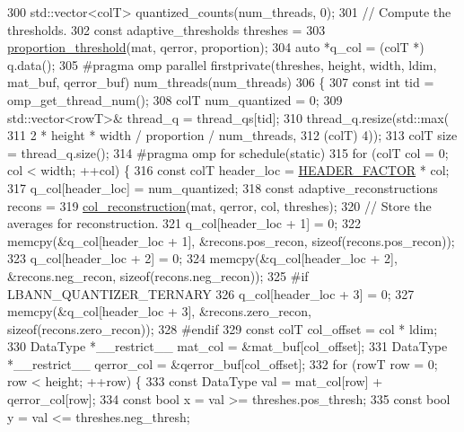\begin{DoxyCode}
300   std::vector<colT> quantized\_counts(num\_threads, 0);
301   \textcolor{comment}{// Compute the thresholds.}
302   \textcolor{keyword}{const} adaptive\_thresholds threshes =
303     \hyperlink{classlbann_1_1lbann__quantizer_aa5aabc1cb4163e95aee993d9b37b9b32}{proportion\_threshold}(mat, qerror, proportion);
304   \textcolor{keyword}{auto} *q\_col = (colT *) q.data();
305 \textcolor{preprocessor}{  #pragma omp parallel firstprivate(threshes, height, width, ldim, mat\_buf, qerror\_buf)
       num\_threads(num\_threads)}
306   \{
307     \textcolor{keyword}{const} \textcolor{keywordtype}{int} tid = omp\_get\_thread\_num();
308     colT num\_quantized = 0;
309     std::vector<rowT>& thread\_q = thread\_qs[tid];
310     thread\_q.resize(std::max(
311                       2 * height * width / proportion / num\_threads,
312                       (colT) 4));
313     colT size = thread\_q.size();
314 \textcolor{preprocessor}{    #pragma omp for schedule(static)}
315     \textcolor{keywordflow}{for} (colT col = 0; col < width; ++col) \{
316       \textcolor{keyword}{const} colT header\_loc = \hyperlink{classlbann_1_1lbann__quantizer_afb4315625e371169cabfac56c3f75d37}{HEADER\_FACTOR} * col;
317       q\_col[header\_loc] = num\_quantized;
318       \textcolor{keyword}{const} adaptive\_reconstructions recons =
319         \hyperlink{classlbann_1_1lbann__quantizer_af77beca5905ff8601ca9b8231a2a16e0}{col\_reconstruction}(mat, qerror, col, threshes);
320       \textcolor{comment}{// Store the averages for reconstruction.}
321       q\_col[header\_loc + 1] = 0;
322       memcpy(&q\_col[header\_loc + 1], &recons.pos\_recon, \textcolor{keyword}{sizeof}(recons.pos\_recon));
323       q\_col[header\_loc + 2] = 0;
324       memcpy(&q\_col[header\_loc + 2], &recons.neg\_recon, \textcolor{keyword}{sizeof}(recons.neg\_recon));
325 \textcolor{preprocessor}{#if LBANN\_QUANTIZER\_TERNARY}
326       q\_col[header\_loc + 3] = 0;
327       memcpy(&q\_col[header\_loc + 3], &recons.zero\_recon, \textcolor{keyword}{sizeof}(recons.zero\_recon));
328 \textcolor{preprocessor}{#endif}
329       \textcolor{keyword}{const} colT col\_offset = col * ldim;
330       DataType *\_\_restrict\_\_ mat\_col = &mat\_buf[col\_offset];
331       DataType *\_\_restrict\_\_ qerror\_col = &qerror\_buf[col\_offset];
332       \textcolor{keywordflow}{for} (rowT row = 0; row < height; ++row) \{
333         \textcolor{keyword}{const} DataType val = mat\_col[row] + qerror\_col[row];
334         \textcolor{keyword}{const} \textcolor{keywordtype}{bool} x = val >= threshes.pos\_thresh;
335         \textcolor{keyword}{const} \textcolor{keywordtype}{bool} y = val <= threshes.neg\_thresh;

\end{DoxyCode}
